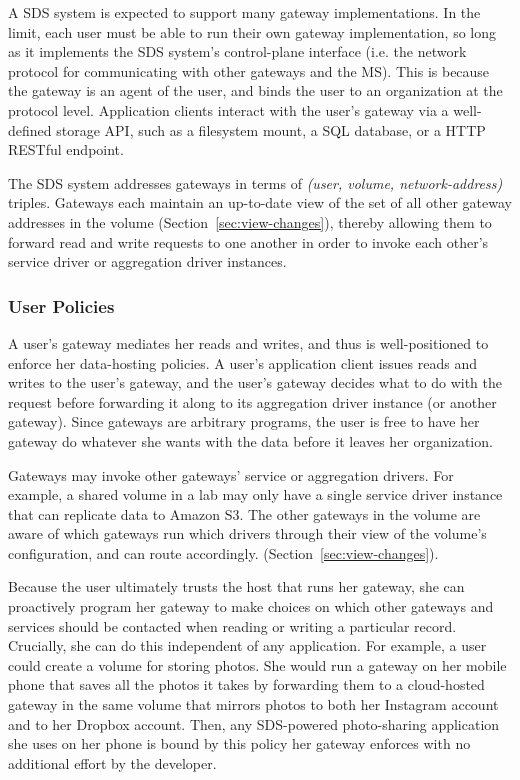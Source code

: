 A SDS system is expected to support many gateway implementations.  In the limit,
each user must be able to run their own gateway implementation, so long as it
implements the SDS system's control-plane interface (i.e. the network protocol
for communicating with other gateways and the MS).  This is because
the gateway is an agent of the user, and binds the user to an organization at
the protocol level.  Application clients interact with the user's gateway via a
well-defined storage API, such as a filesystem mount, a SQL database, or a
HTTP RESTful endpoint.

The SDS system addresses gateways in terms of \textit{(user, volume,
network-address)} triples.  Gateways each maintain an up-to-date view of the set
of all other gateway addresses in the volume (Section~\ref{sec:view-changes}),
thereby allowing them to forward read and write requests to one another in order
to invoke each other's service driver or aggregation driver instances.

\subsubsection{User Policies}

A user's gateway mediates her reads and writes, and thus is well-positioned to enforce her data-hosting
policies.  A user's application client issues reads and writes to the user's
gateway, and the user's gateway decides what to do with the request before
forwarding it along to its aggregation driver instance (or another gateway).
Since gateways are arbitrary programs, the user is free to have her gateway do
whatever she wants with the data before it leaves her organization.

Gateways may invoke other gateways' service or aggregation drivers.  For
example, a shared volume in a lab may only have a single service driver instance
that can replicate data to Amazon S3.  The other gateways in the volume are
aware of which gateways run which drivers through their view of the volume's
configuration, and can route accordingly.
(Section~\ref{sec:view-changes}).

Because the user ultimately trusts the host that runs her gateway, she can
proactively program her gateway to make choices on which other gateways and
services should be contacted when reading or writing a particular record.
Crucially, she can do this independent of any application.  For example, a user
could create a volume for storing photos.  She would run
a gateway on her mobile phone that saves all the photos it takes
by forwarding them to a cloud-hosted gateway in the same volume
that mirrors photos to both her Instagram account and to her Dropbox account.
Then, any SDS-powered photo-sharing application she uses on her phone is bound
by this policy her gateway enforces with no additional effort by the developer.

